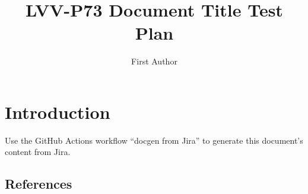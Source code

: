 \documentclass[DM,lsstdraft,toc]{lsstdoc}
\begin{document}
\def\milestoneName{Document Title}
\def\milestoneId{LVV-P73}
\def\product{Data Management}


\title{LVV-P73 Document Title Test Plan }
\setDocRef{\lsstDocType-\lsstDocNum}
\date{\vcsDate}
\author{First Author}




\maketitle

\section{Introduction}
Use the GitHub Actions workflow ``docgen from Jira'' to generate this document's content from Jira.

\subsection{References}
\label{sect:references}
\renewcommand{\refname}{}




\end{document}

